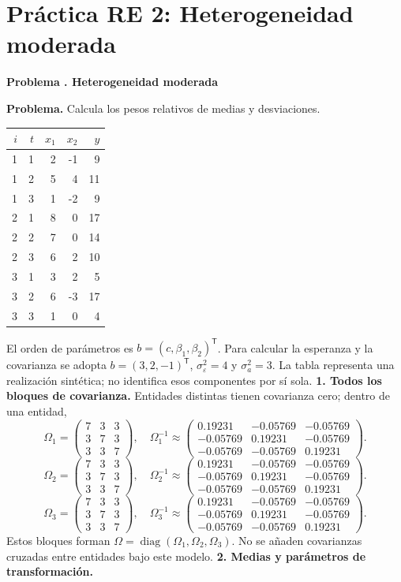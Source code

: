 \documentclass[11pt,a4paper]{article}
\newcommand{\T}{^{\mathsf T}}
\DeclareMathOperator{\diag}{diag}
\theoremstyle{definition}
\newcounter{problema}
\newenvironment{resuelto}[1]{\refstepcounter{problema}\par\medskip\Needspace{6\baselineskip}\textbf{Problema \theproblema. #1}\par}{\par\medskip}
\newcommand{\eps}{\varepsilon}
\begin{document}
\section{Práctica RE 2: Heterogeneidad moderada}
\begin{resuelto}{Heterogeneidad moderada}
\textbf{Problema.} Calcula los pesos relativos de medias y desviaciones.

\begin{center}\small
\begin{tabular}{rrrrr}
\toprule
$i$&$t$&$x_1$&$x_2$&$y$\\
\midrule
1&1&2&-1&9\\
1&2&5&4&11\\
1&3&1&-2&9\\
2&1&8&0&17\\
2&2&7&0&14\\
2&3&6&2&10\\
3&1&3&2&5\\
3&2&6&-3&17\\
3&3&1&0&4\\
\bottomrule
\end{tabular}
\end{center}
El orden de parámetros es $b=(c,\beta_1,\beta_2)\T$. Para calcular la esperanza y la covarianza se adopta $b=(3,2,-1)\T$, $\sigma_\eps^2=4$ y $\sigma_a^2=3$. La tabla representa una realización sintética; no identifica esos componentes por sí sola.
\textbf{1. Todos los bloques de covarianza.} Entidades distintas tienen covarianza cero; dentro de una entidad,
\[
\Omega_{1}=\begin{pmatrix}
7&3&3\\3&7&3\\3&3&7
\end{pmatrix},\quad \Omega_{1}^{-1}\approx\begin{pmatrix}
0.19231&-0.05769&-0.05769\\-0.05769&0.19231&-0.05769\\-0.05769&-0.05769&0.19231
\end{pmatrix}.
\]
\[
\Omega_{2}=\begin{pmatrix}
7&3&3\\3&7&3\\3&3&7
\end{pmatrix},\quad \Omega_{2}^{-1}\approx\begin{pmatrix}
0.19231&-0.05769&-0.05769\\-0.05769&0.19231&-0.05769\\-0.05769&-0.05769&0.19231
\end{pmatrix}.
\]
\[
\Omega_{3}=\begin{pmatrix}
7&3&3\\3&7&3\\3&3&7
\end{pmatrix},\quad \Omega_{3}^{-1}\approx\begin{pmatrix}
0.19231&-0.05769&-0.05769\\-0.05769&0.19231&-0.05769\\-0.05769&-0.05769&0.19231
\end{pmatrix}.
\]
Estos bloques forman $\Omega=\diag(\Omega_1,\Omega_2,\Omega_3)$. No se añaden covarianzas cruzadas entre entidades bajo este modelo.
\textbf{2. Medias y parámetros de transformación.}


\end{resuelto}
\end{document}

